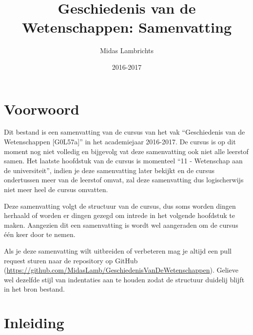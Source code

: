 \documentclass{article}
\title{Geschiedenis van de Wetenschappen: Samenvatting}
\author{Midas Lambrichts}
\date{2016-2017}
\begin{document}
  \maketitle
  \tableofcontents
  \newpage

  \section*{Voorwoord}
  Dit bestand is een samenvatting van de cursus van het vak ``Geschiedenis van de Wetenschappen [G0L57a]'' in het academiejaar 2016-2017. De cursus is op dit moment nog niet volledig en bijgevolg vat deze samenvatting ook niet alle leerstof samen. Het laatste hoofdstuk van de cursus is momenteel ``11 - Wetenschap aan de universiteit'', indien je deze samenvatting later bekijkt en de cursus ondertussen meer van de leerstof omvat, zal deze samenvatting dus logischerwijs niet meer heel de cursus omvatten.

  Deze samenvatting volgt de structuur van de cursus, dus soms worden dingen herhaald of worden er dingen gezegd om intrede in het volgende hoofdstuk te maken. Aangezien dit een samenvatting is wordt wel aangeraden om de cursus \'e\'en keer door te nemen.

  Als je deze samenvatting wilt uitbreiden of verbeteren mag je altijd een pull request sturen naar de repository op GitHub (\url{https://github.com/MidasLamb/GeschiedenisVanDeWetenschappen}). Gelieve wel dezelfde stijl van indentaties aan te houden zodat de structuur duidelij blijft in het bron bestand.

  \newpage
  \section*{Inleiding}
\end{document}
